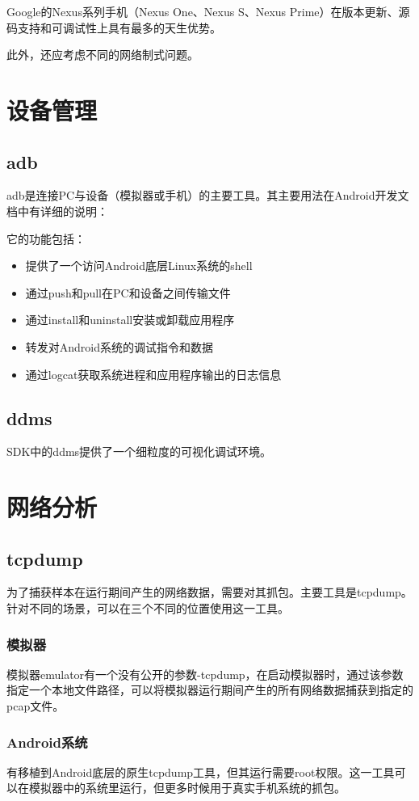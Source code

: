 Google的Nexus系列手机（Nexus One、Nexus S、Nexus Prime）在版本更新、源码支持和可调试性上具有最多的天生优势。

此外，还应考虑不同的网络制式问题。

\section{设备管理}
\subsection{adb}
adb是连接PC与设备（模拟器或手机）的主要工具。其主要用法在Android开发文档中有详细的说明：

它的功能包括：
\begin{itemize}
\item 提供了一个访问Android底层Linux系统的shell
\item 通过push和pull在PC和设备之间传输文件
\item 通过install和uninstall安装或卸载应用程序
\item 转发对Android系统的调试指令和数据
\item 通过logcat获取系统进程和应用程序输出的日志信息
\end{itemize}

\subsection{ddms}
SDK中的ddms提供了一个细粒度的可视化调试环境。
\section{网络分析}
\subsection{tcpdump}
为了捕获样本在运行期间产生的网络数据，需要对其抓包。主要工具是tcpdump。针对不同的场景，可以在三个不同的位置使用这一工具。
\subsubsection{模拟器}
模拟器emulator有一个没有公开的参数-tcpdump，在启动模拟器时，通过该参数指定一个本地文件路径，可以将模拟器运行期间产生的所有网络数据捕获到指定的pcap文件。
\subsubsection{Android系统}
有移植到Android底层的原生tcpdump工具，但其运行需要root权限。这一工具可以在模拟器中的系统里运行，但更多时候用于真实手机系统的抓包。
